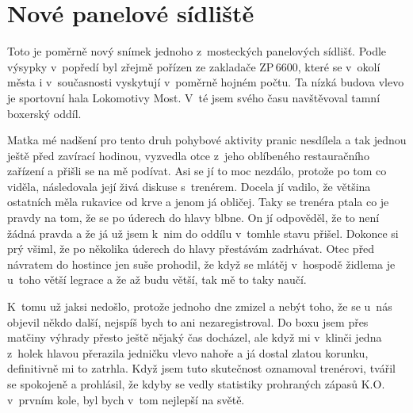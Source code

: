 
\chapter{Nové panelové sídliště}

Toto je poměrně nový snímek jednoho z~mosteckých panelových sídlišť. Podle
výsypky v~popředí byl zřejmě pořízen ze zakladače ZP\,6600, které se v~okolí
města i v~současnosti vyskytují v~poměrně hojném počtu. Ta nízká budova vlevo
je sportovní hala Lokomotivy Most. V~té jsem svého času navštěvoval tamní
boxerský oddíl.

Matka mé nadšení pro tento druh pohybové aktivity pranic nesdílela a tak jednou
ještě před zavírací hodinou, vyzvedla otce z~jeho oblíbeného restauračního
zařízení a přišli se na mě podívat. Asi se jí to moc nezdálo, protože po tom co
viděla, následovala její živá diskuse s~trenérem. Docela jí vadilo, že většina
ostatních měla rukavice od krve a jenom já obličej. Taky se trenéra ptala co je
pravdy na tom, že se po úderech do hlavy blbne. On jí odpověděl, že to není
žádná pravda a že já už jsem k~nim do oddílu v~tomhle stavu přišel. Dokonce si
prý všiml, že po několika úderech do hlavy přestávám zadrhávat. Otec před
návratem do hostince jen suše prohodil, že když se mlátěj v~hospodě židlema je
u~toho větší legrace a že až budu větší, tak mě to taky naučí.

K~tomu už jaksi nedošlo, protože jednoho dne zmizel a nebýt toho, že se u~nás
objevil někdo další, nejspíš bych to ani nezaregistroval. Do boxu jsem přes
matčiny výhrady přesto ještě nějaký čas docházel, ale když mi v~klinči jedna
z~holek hlavou přerazila jedničku vlevo nahoře a já dostal zlatou korunku,
definitivně mi to zatrhla. Když jsem tuto skutečnost oznamoval trenérovi,
tvářil se spokojeně a prohlásil, že kdyby se vedly statistiky prohraných zápasů
K.O. v~prvním kole, byl bych v~tom nejlepší na světě.


